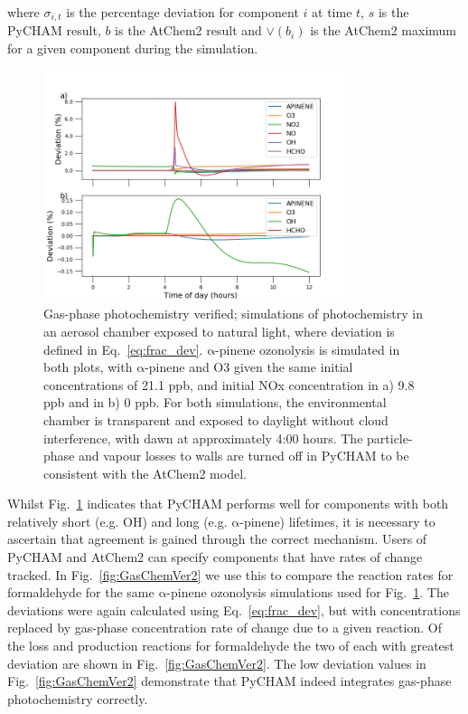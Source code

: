 \documentclass[gmd, manuscript]{copernicus}
\begin{document}
where $\sigma_{i,t}$ is the percentage deviation for component $i$ at time $t$, $s$ is the PyCHAM result, $b$ is the AtChem2 result and $\lor(b_{i})$ is the AtChem2 maximum for a given component during the simulation.

\begin{figure}[t]
\includegraphics[width=9.0cm]{Results/photo_chem_conc_dev.png}
\caption{Gas-phase photochemistry verified; simulations of photochemistry in an aerosol chamber exposed to natural light, where deviation is defined in Eq.~\ref{eq:frac_dev}.  $\mathrm{\alpha}$-pinene ozonolysis is simulated in both plots, with $\mathrm{\alpha}$-pinene and O3 given the same initial concentrations of 21.1 ppb, and initial NOx concentration in a) 9.8 ppb and in b) 0 ppb.  For both simulations, the environmental chamber is transparent and exposed to daylight without cloud interference, with dawn at approximately 4:00 hours.  The particle-phase and vapour losses to walls are turned off in PyCHAM to be consistent with the AtChem2 model.}
\label{fig:GasChemVer1}
\end{figure}

Whilst Fig.~\ref{fig:GasChemVer1} indicates that PyCHAM performs well for components with both relatively short (e.g. OH) and long (e.g. $\mathrm{\alpha}$-pinene) lifetimes, it is necessary to ascertain that agreement is gained through the correct mechanism.  Users of PyCHAM and AtChem2 can specify components that have rates of change tracked.  In Fig.~\ref{fig:GasChemVer2} we use this to compare the reaction rates for formaldehyde for the same $\mathrm{\alpha}$-pinene ozonolysis simulations used for Fig.~\ref{fig:GasChemVer1}.  The deviations were again calculated using Eq.~\ref{eq:frac_dev}, but with concentrations replaced by gas-phase concentration rate of change due to a given reaction.  Of the loss and production reactions for formaldehyde the two of each with greatest deviation are shown in Fig.~\ref{fig:GasChemVer2}.  The low deviation values in Fig.~\ref{fig:GasChemVer2} demonstrate that PyCHAM indeed integrates gas-phase photochemistry correctly.
\end{document}
